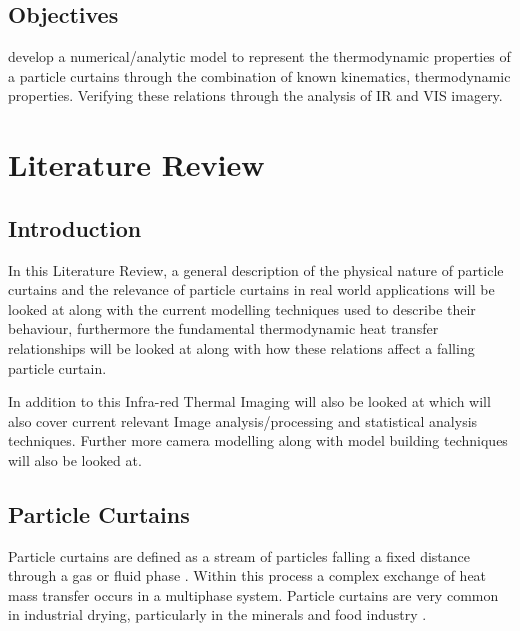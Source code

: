 \documentclass[12pt]{article}
\newcommand{\ts}{\textsuperscript}
\newcommand{\pe}{\vspace{0.3cm}}
\newcommand{\mycite}[1]{\ts{\cite{#1}}}
\begin{document}
\subsection{Objectives}

develop a numerical/analytic model to represent the thermodynamic properties of a particle curtains through the combination of known kinematics, thermodynamic properties. Verifying these relations through the analysis of IR and VIS imagery.    


\section{Literature Review}

\subsection{Introduction}

In this Literature Review, a general description of the physical nature of particle curtains and the relevance of particle curtains in real world applications will be looked at along with the current modelling techniques used to describe their behaviour, furthermore the fundamental thermodynamic heat transfer relationships will be looked at along with how these relations affect a falling particle curtain. 

\pe 

In addition to this Infra-red Thermal Imaging will also be looked at which will also cover current relevant Image analysis/processing and statistical analysis techniques. Further more camera modelling along with model building techniques will also be looked at.   

\subsection{Particle Curtains}
Particle curtains are defined as a stream of particles falling a fixed distance through a gas or fluid phase \mycite{AfsharCurtainPhd}. Within this process a complex exchange of heat mass transfer occurs in a multiphase system. 
Particle curtains are very common in industrial drying, particularly in the minerals and food industry \mycite{AfsharCurtainPhd}. 
\end{document}
